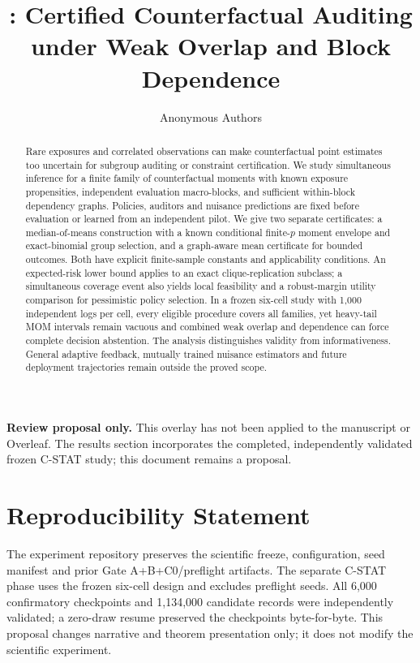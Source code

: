 \documentclass{article}
\title{\COMET: Certified Counterfactual Auditing\\under Weak Overlap and Block Dependence}
\author{Anonymous Authors}
\theoremstyle{plain}
\theoremstyle{definition}
\theoremstyle{remark}
\begin{document}
\maketitle

\noindent\textbf{Review proposal only.} This overlay has not been applied to the manuscript or Overleaf. The results section incorporates the completed, independently validated frozen C-STAT study; this document remains a proposal.

\begin{abstract}
Rare exposures and correlated observations can make counterfactual point estimates too uncertain for subgroup auditing or constraint certification. We study simultaneous inference for a finite family of counterfactual moments with known exposure propensities, independent evaluation macro-blocks, and sufficient within-block dependency graphs. Policies, auditors and nuisance predictions are fixed before evaluation or learned from an independent pilot. We give two separate certificates: a median-of-means construction with a known conditional finite-$p$ moment envelope and exact-binomial group selection, and a graph-aware mean certificate for bounded outcomes. Both have explicit finite-sample constants and applicability conditions. An expected-risk lower bound applies to an exact clique-replication subclass; a simultaneous coverage event also yields local feasibility and a robust-margin utility comparison for pessimistic policy selection. In a frozen six-cell study with 1,000 independent logs per cell, every eligible procedure covers all families, yet heavy-tail MOM intervals remain vacuous and combined weak overlap and dependence can force complete decision abstention. The analysis distinguishes validity from informativeness. General adaptive feedback, mutually trained nuisance estimators and future deployment trajectories remain outside the proved scope.
\end{abstract}










\section*{Reproducibility Statement}
The experiment repository preserves the scientific freeze, configuration, seed manifest and prior Gate A+B+C0/preflight artifacts. The separate C-STAT phase uses the frozen six-cell design and excludes preflight seeds. All 6,000 confirmatory checkpoints and 1,134,000 candidate records were independently validated; a zero-draw resume preserved the checkpoints byte-for-byte. This proposal changes narrative and theorem presentation only; it does not modify the scientific experiment.
\end{document}
